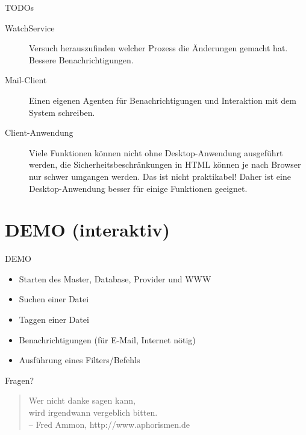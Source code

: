 \documentclass{beamer}
\begin{document}
\begin{frame}
	
	
	\begin{block}{TODOs}
		\begin{description}
				
			\item[WatchService] Versuch herauszufinden welcher Prozess die Änderungen gemacht hat.\\
			Bessere Benachrichtigungen.
			
			
			
			\item[Mail-Client] 
			Einen eigenen Agenten für Benachrichtigungen und Interaktion mit dem System schreiben.
			\item[Client-Anwendung]
			Viele Funktionen können nicht ohne Desktop-Anwendung ausgeführt werden, die Sicherheitsbeschränkungen in HTML
			können je nach Browser nur schwer umgangen werden. Das ist nicht praktikabel! Daher ist eine Desktop-Anwendung besser für einige Funktionen geeignet.
			
			
		\end{description}
	\end{block}
	
	\bigskip 
	
	
\end{frame}


\section{DEMO (interaktiv)}

\begin{frame}
	
	
	\begin{exampleblock}{DEMO}	\begin{itemize}
			\item Starten des Master, Database, Provider und WWW
			\item Suchen einer Datei
			\item Taggen einer Datei
			\item Benachrichtigungen (für E-Mail, Internet nötig)
			\item Ausführung eines Filters/Befehls
			
		\end{itemize}
	\end{exampleblock}

	
\end{frame}

\begin{frame}{Fragen?}
	\begin{block}{}
		\begin{quote}
			
			
Wer nicht danke sagen kann,\\
wird irgendwann vergeblich bitten. \\
– Fred Ammon, http://www.aphorismen.de
		\end{quote}

	\end{block}
	
	\bigskip
	 
\end{frame}
\end{document}
